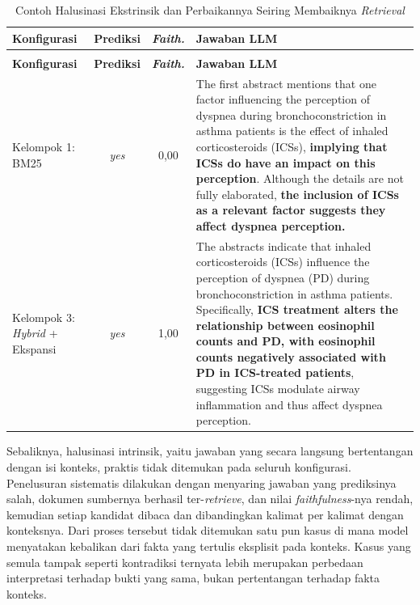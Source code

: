 {\footnotesize
\setlength{\tabcolsep}{4pt}
\begin{longtable}{@{}>{\raggedright\arraybackslash}p{2.3cm} c c >{\raggedright\arraybackslash}p{8.2cm}@{}}
\caption{Contoh Halusinasi Ekstrinsik dan Perbaikannya Seiring Membaiknya \textit{Retrieval}}
\label{tbl:contoh-ekstrinsik} \\
\toprule
\textbf{Konfigurasi} & \textbf{Prediksi} & \textbf{\textit{Faith.}} & \textbf{Jawaban LLM} \\
\midrule
\endfirsthead
\multicolumn{4}{@{}l}{\textit{Lanjutan Tabel~\ref{tbl:contoh-ekstrinsik}.}} \\
\toprule
\textbf{Konfigurasi} & \textbf{Prediksi} & \textbf{\textit{Faith.}} & \textbf{Jawaban LLM} \\
\midrule
\endhead
Kelompok 1: BM25 & \textit{yes} & 0{,}00 & The first abstract mentions that one factor influencing the perception of dyspnea during bronchoconstriction in asthma patients is the effect of inhaled corticosteroids (ICSs), \textbf{implying that ICSs do have an impact on this perception}. Although the details are not fully elaborated, \textbf{the inclusion of ICSs as a relevant factor suggests they affect dyspnea perception.} \\
\addlinespace
Kelompok 3: \textit{Hybrid} + Ekspansi & \textit{yes} & 1{,}00 & The abstracts indicate that inhaled corticosteroids (ICSs) influence the perception of dyspnea (PD) during bronchoconstriction in asthma patients. Specifically, \textbf{ICS treatment alters the relationship between eosinophil counts and PD, with eosinophil counts negatively associated with PD in ICS-treated patients}, suggesting ICSs modulate airway inflammation and thus affect dyspnea perception. \\
\bottomrule
\end{longtable}
}

Sebaliknya, halusinasi intrinsik, yaitu jawaban yang secara langsung bertentangan dengan isi konteks, praktis tidak ditemukan pada seluruh konfigurasi. Penelusuran sistematis dilakukan dengan menyaring jawaban yang prediksinya salah, dokumen sumbernya berhasil ter-\textit{retrieve}, dan nilai \textit{faithfulness}-nya rendah, kemudian setiap kandidat dibaca dan dibandingkan kalimat per kalimat dengan konteksnya. Dari proses tersebut tidak ditemukan satu pun kasus di mana model menyatakan kebalikan dari fakta yang tertulis eksplisit pada konteks. Kasus yang semula tampak seperti kontradiksi ternyata lebih merupakan perbedaan interpretasi terhadap bukti yang sama, bukan pertentangan terhadap fakta konteks.

